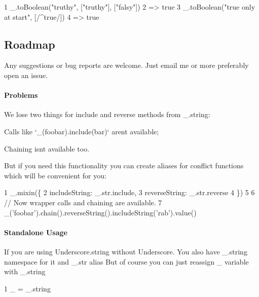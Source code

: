 \begin{DoxyCode}
1 \_.toBoolean("truthy", ["truthy"], ["falsy"])
2 => true
3 \_.toBoolean("true only at start", [/^true/])
4 => true
\end{DoxyCode}


\subsection*{Roadmap}

Any suggestions or bug reports are welcome. Just email me or more preferably open an issue.

\paragraph*{Problems}

We lose two things for {\ttfamily include} and {\ttfamily reverse} methods from {\ttfamily \+\_\+.\+string}\+:


\begin{DoxyItemize}
\item Calls like `\+\_\+(\textquotesingle{}foobar\textquotesingle{}).include(\textquotesingle{}bar\textquotesingle{})` aren\textquotesingle{}t available;
\item Chaining isn\textquotesingle{}t available too.
\end{DoxyItemize}

But if you need this functionality you can create aliases for conflict functions which will be convenient for you\+:


\begin{DoxyCode}
1 \_.mixin(\{
2     includeString: \_.str.include,
3     reverseString: \_.str.reverse
4 \})
5 
6 // Now wrapper calls and chaining are available.
7 \_('foobar').chain().reverseString().includeString('rab').value()
\end{DoxyCode}


\paragraph*{Standalone Usage}

If you are using Underscore.\+string without Underscore. You also have {\ttfamily \+\_\+.\+string} namespace for it and {\ttfamily \+\_\+.\+str} alias But of course you can just reassign {\ttfamily \+\_\+} variable with {\ttfamily \+\_\+.\+string}


\begin{DoxyCode}
1 \_ = \_.string
\end{DoxyCode}


